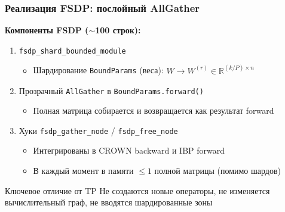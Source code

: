 \begin{frame}
\frametitle{Реализация FSDP: послойный AllGather}

\textbf{Компоненты FSDP ($\sim$100 строк):}

\begin{enumerate}
    \item \texttt{fsdp\_shard\_bounded\_module}
    \begin{itemize}
        \item Шардирование \texttt{BoundParams} (веса): $W \to W^{(r)} \in \mathbb{R}^{(k/P) \times n}$
    \end{itemize}

    \item Прозрачный \texttt{AllGather} в \texttt{BoundParams.forward()}
    \begin{itemize}
        \item Полная матрица собирается и возвращается как результат forward
    \end{itemize}

    \item Хуки \texttt{fsdp\_gather\_node} / \texttt{fsdp\_free\_node}
    \begin{itemize}
        \item Интегрированы в CROWN backward и IBP forward
        \item В каждый момент в памяти $\leq 1$ полной матрицы (помимо шардов)
    \end{itemize}
\end{enumerate}

\vspace{0.3cm}

\begin{exampleblock}{Ключевое отличие от TP}
Не создаются новые операторы, не изменяется вычислительный граф, не вводятся шардированные зоны
\end{exampleblock}

\end{frame}

